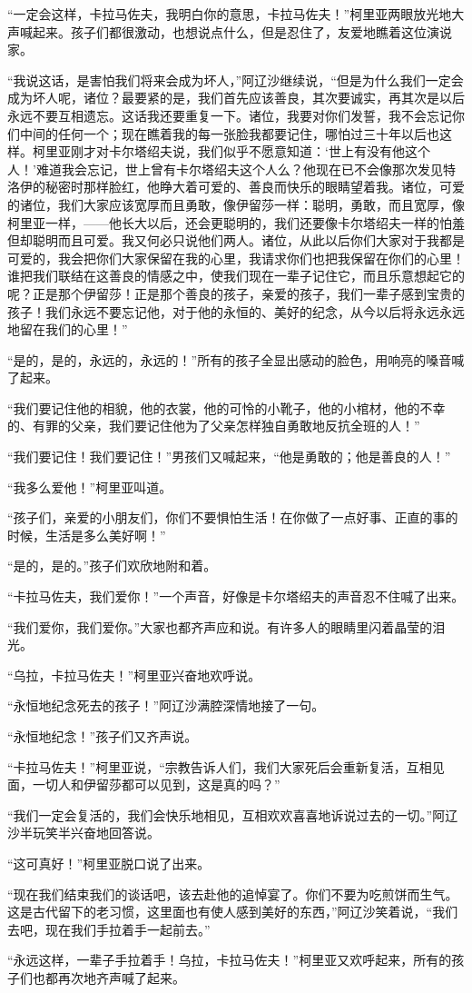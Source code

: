 \par “一定会这样，卡拉马佐夫，我明白你的意思，卡拉马佐夫！”柯里亚两眼放光地大声喊起来。孩子们都很激动，也想说点什么，但是忍住了，友爱地瞧着这位演说家。
\par “我说这话，是害怕我们将来会成为坏人，”阿辽沙继续说，“但是为什么我们一定会成为坏人呢，诸位？最要紧的是，我们首先应该善良，其次要诚实，再其次是以后永远不要互相遗忘。这话我还要重复一下。诸位，我要对你们发誓，我不会忘记你们中间的任何一个；现在瞧着我的每一张脸我都要记住，哪怕过三十年以后也这样。柯里亚刚才对卡尔塔绍夫说，我们似乎不愿意知道：‘世上有没有他这个人！’难道我会忘记，世上曾有卡尔塔绍夫这个人么？他现在已不会像那次发见特洛伊的秘密时那样脸红，他睁大着可爱的、善良而快乐的眼睛望着我。诸位，可爱的诸位，我们大家应该宽厚而且勇敢，像伊留莎一样：聪明，勇敢，而且宽厚，像柯里亚一样，——他长大以后，还会更聪明的，我们还要像卡尔塔绍夫一样的怕羞但却聪明而且可爱。我又何必只说他们两人。诸位，从此以后你们大家对于我都是可爱的，我会把你们大家保留在我的心里，我请求你们也把我保留在你们的心里！谁把我们联结在这善良的情感之中，使我们现在一辈子记住它，而且乐意想起它的呢？正是那个伊留莎！正是那个善良的孩子，亲爱的孩子，我们一辈子感到宝贵的孩子！我们永远不要忘记他，对于他的永恒的、美好的纪念，从今以后将永远永远地留在我们的心里！”
\par “是的，是的，永远的，永远的！”所有的孩子全显出感动的脸色，用响亮的嗓音喊了起来。
\par “我们要记住他的相貌，他的衣裳，他的可怜的小靴子，他的小棺材，他的不幸的、有罪的父亲，我们要记住他为了父亲怎样独自勇敢地反抗全班的人！”
\par “我们要记住！我们要记住！”男孩们又喊起来，“他是勇敢的；他是善良的人！”
\par “我多么爱他！”柯里亚叫道。
\par “孩子们，亲爱的小朋友们，你们不要惧怕生活！在你做了一点好事、正直的事的时候，生活是多么美好啊！”
\par “是的，是的。”孩子们欢欣地附和着。
\par “卡拉马佐夫，我们爱你！”一个声音，好像是卡尔塔绍夫的声音忍不住喊了出来。
\par “我们爱你，我们爱你。”大家也都齐声应和说。有许多人的眼睛里闪着晶莹的泪光。
\par “乌拉，卡拉马佐夫！”柯里亚兴奋地欢呼说。
\par “永恒地纪念死去的孩子！”阿辽沙满腔深情地接了一句。
\par “永恒地纪念！”孩子们又齐声说。
\par “卡拉马佐夫！”柯里亚说，“宗教告诉人们，我们大家死后会重新复活，互相见面，一切人和伊留莎都可以见到，这是真的吗？”
\par “我们一定会复活的，我们会快乐地相见，互相欢欢喜喜地诉说过去的一切。”阿辽沙半玩笑半兴奋地回答说。
\par “这可真好！”柯里亚脱口说了出来。
\par “现在我们结束我们的谈话吧，该去赴他的追悼宴了。你们不要为吃煎饼而生气。这是古代留下的老习惯，这里面也有使人感到美好的东西，”阿辽沙笑着说，“我们去吧，现在我们手拉着手一起前去。”
\par “永远这样，一辈子手拉着手！乌拉，卡拉马佐夫！”柯里亚又欢呼起来，所有的孩子们也都再次地齐声喊了起来。




